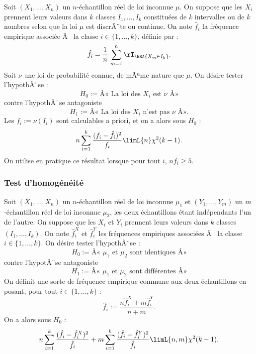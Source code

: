 Soit $(X_1,\ldots,X_n)$ un $n$-échantillon réel de loi inconnue $\mu$. On
suppose que les $X_i$ prennent leurs valeurs dans $k$ classes $I_1,\ldots,I_k$
constituées de $k$ intervalles ou de $k$ nombres selon que la loi $\mu$ est
discrÃ¨te ou continue. On note $\hat f_i$ la fréquence empirique associée Ã  la
classe $i\in\{1,\ldots,k\}$, définie par :
\begin{equation*}
  \hat f_i=\frac{1}{n}\,\sum_{m=1}^n \rI_\BRA{X_m \in I_k}.
\end{equation*}
Soit $\nu$ une loi de probabilité connue, de mÃªme nature que $\mu$. On désire
tester l'hypothÃ¨se :
$$
H_0:=\text{Â« La loi des } X_i \text{ est } \nu \text{ Â»} 
$$
contre l'hypothÃ¨se antagoniste 
$$
H_1:=\text{Â« La loi des } X_i \text{ n'est pas } \nu \text{ Â»}.
$$
Les $f_i:=\nu(I_i)$ sont calculables a priori, et on a alors sous $H_0$ :
\begin{equation*}
  n\sum_{i=1}^k \frac{(f_i-\hat f_i)^2}{f_i} \limL{n} \chi^2(k-1).
\end{equation*}
On utilise en pratique ce résultat lorsque pour tout $i$, $n f_i \geq 5$.

\subsubsection{Test d'homogénéité} 

Soit $(X_1,\ldots,X_n)$ un $n$-échantillon réel de loi inconnue $\mu_1$ et
$(Y_1,\ldots,Y_m)$ un $m$-échantillon réel de loi inconnue $\mu_2$, les deux
échantillons étant indépendants l'un de l'autre. On suppose que les $X_i$ et
$Y_i$ prennent leurs valeurs dans $k$ classes $(I_1,\ldots,I_k)$. On note
$\hat f^X_i$ et $\hat f^Y_i$ les fréquences empiriques associées Ã  la classe
$i\in\{1,\ldots,k\}$. On désire tester l'hypothÃ¨se :
$$
H_0:=\text{Â« } \mu_1 \text{ et } \mu_2 \text{ sont identiques Â»}
$$
contre l'hypotÃ¨se antagoniste
$$
H_1:=\text{Â« } \mu_1 \text{ et } \mu_2 \text{ sont différentes Â»}
$$
On définit une sorte de fréquence empirique commune aux deux échantillons
en posant, pour tout $i\in\{1,\ldots,k\}$ :
\begin{equation*}
  \hat f_i := \frac{n\hat f^X_i + m\hat f^Y_i}{n+m}.
\end{equation*}
On a alors sous $H_0$ :
\begin{equation*}
  n\sum_{i=1}^k \frac{(\hat f_i-\hat f^X_i)^2}{\hat f_i}
 +m\sum_{i=1}^k \frac{(\hat f_i-\hat f^Y_i)^2}{\hat f_i} 
 \limL{n,m} \chi^2(k-1).
\end{equation*}

